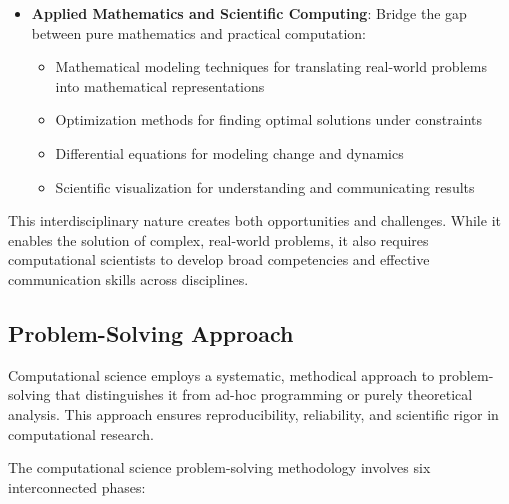 \begin{itemize}
  \item \textbf{Applied Mathematics and Scientific Computing}: Bridge the gap between pure mathematics and practical computation:
  \begin{itemize}
    \item Mathematical modeling techniques for translating real-world problems into mathematical representations
    \item Optimization methods for finding optimal solutions under constraints
    \item Differential equations for modeling change and dynamics
    \item Scientific visualization for understanding and communicating results
  \end{itemize}
\end{itemize}

This interdisciplinary nature creates both opportunities and challenges. While it enables the solution of complex, real-world problems, it also requires computational scientists to develop broad competencies and effective communication skills across disciplines.

\subsection{Problem-Solving Approach}

Computational science employs a systematic, methodical approach to problem-solving that distinguishes it from ad-hoc programming or purely theoretical analysis. This approach ensures reproducibility, reliability, and scientific rigor in computational research.

The computational science problem-solving methodology involves six interconnected phases:

